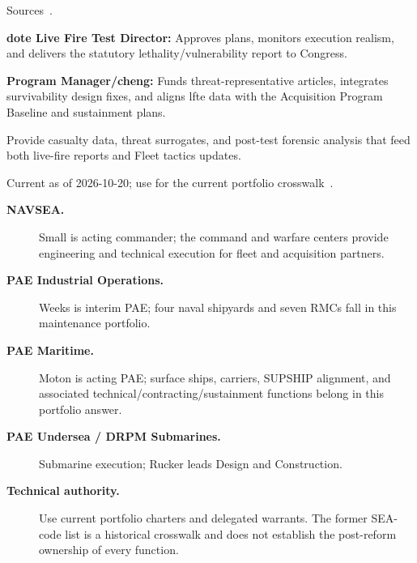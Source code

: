 \documentclass[../main.tex]{subfiles}
\begin{document}
\begin{description}[style=nextline, labelsep=0.5em, font=\bfseries]
\begin{description}
        \end{description}
  \item[\textbf{Live-fire statutory leads.}]
        Sources~\autocite{USC-10-4172,DoDI5000-89}.
        \begin{description}
          \item \textbf{\ac{dote} Live Fire Test Director:} Approves plans, monitors execution realism, and delivers the statutory lethality/vulnerability report to Congress.
          \item \textbf{Program Manager/\ac{cheng}:} Funds threat-representative articles, integrates survivability design fixes, and aligns \ac{lfte} data with the Acquisition Program Baseline and sustainment plans.
          \item[\textbf{Service Safety Centers and Warfare Centers:}] Provide casualty data, threat surrogates, and post-test forensic analysis that feed both live-fire reports and Fleet tactics updates.
        \end{description}

  \item[\textbf{NAVSEA and PAE roles after realignment.}]
        Current as of 2026-10-20; use \Tab{\ref{tab:navsea-pae-current}} for the current portfolio crosswalk~\autocite{edo-2-1-2-navsea-organization-2025,DON-PAE-Expansion-May2026,DVIDS-Weeks-PAEIO-Aug2026}.
        \begin{description}
          \item[\textbf{NAVSEA.}] Small is acting commander; the command and warfare centers provide engineering and technical execution for fleet and acquisition partners.
          \item[\textbf{PAE Industrial Operations.}] Weeks is interim PAE; four naval shipyards and seven RMCs fall in this maintenance portfolio.
          \item[\textbf{PAE Maritime.}] Moton is acting PAE; surface ships, carriers, SUPSHIP alignment, and associated technical/contracting/sustainment functions belong in this portfolio answer.
          \item[\textbf{PAE Undersea / DRPM Submarines.}] Submarine execution; Rucker leads Design and Construction.
          \item[\textbf{Technical authority.}] Use current portfolio charters and delegated warrants. The former SEA-code list is a historical crosswalk and does not establish the post-reform ownership of every function.
        \end{description}


\end{description}
\end{document}
